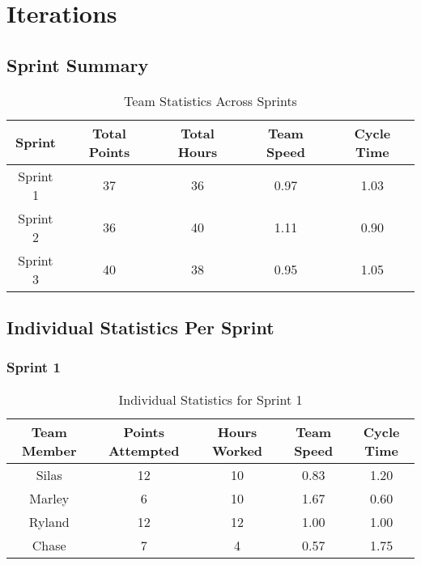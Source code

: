 \clearpage
\section{Iterations}

\subsection{Sprint Summary}
\begin{table}[H]
    \centering
    \begin{tabular}{|c|c|c|c|c|}
    \hline
    \textbf{Sprint} & \textbf{Total Points} & \textbf{Total Hours} & \textbf{Team Speed} & \textbf{Cycle Time}  \\ \hline
    Sprint 1 & 37 & 36 & 0.97 & 1.03 \\ \hline
    Sprint 2 & 36 & 40 & 1.11 & 0.90 \\ \hline
    Sprint 3 & 40 & 38 & 0.95 & 1.05 \\ \hline
    \end{tabular}
    \caption{Team Statistics Across Sprints}
    \label{tab:team_stats}
\end{table}

\subsection{Individual Statistics Per Sprint}

\subsubsection{Sprint 1}
\begin{table}[H]
    \centering
    \begin{tabular}{|c|c|c|c|c|}
    \hline
    \textbf{Team Member} & \textbf{Points Attempted} & \textbf{Hours Worked} & \textbf{Team Speed} & \textbf{Cycle Time}  \\ \hline
    Silas & 12 & 10 & 0.83 & 1.20 \\ \hline
    Marley & 6 & 10 & 1.67 & 0.60 \\ \hline
    Ryland & 12 & 12 & 1.00 & 1.00 \\ \hline
    Chase & 7 & 4 & 0.57 & 1.75 \\ \hline
    \end{tabular}
    \caption{Individual Statistics for Sprint 1}
    \label{tab:individual_sprint1}
\end{table}

